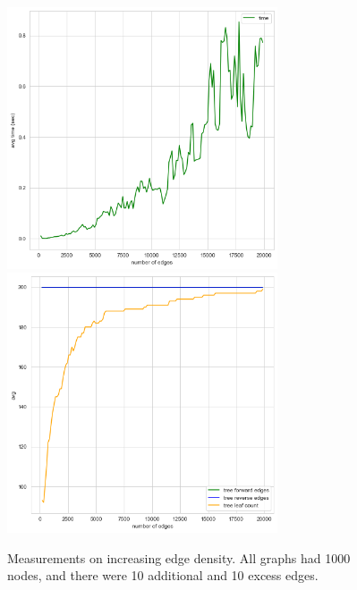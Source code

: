 \documentclass{article}
\begin{document}
\begin{landscape}
\begin{figure}
  \includegraphics[width=8cm]{figures/random_uj/edge_time.png}
  \hspace{1cm}
  \includegraphics[width=8cm]{figures/random_uj/edge_tree.png}

  \caption{Measurements on increasing edge density. All graphs had 1000 nodes, and there were 10 additional and 10 excess edges.}
  \label{fig:edge-density}
\end{figure}
\end{landscape}
\end{document}
